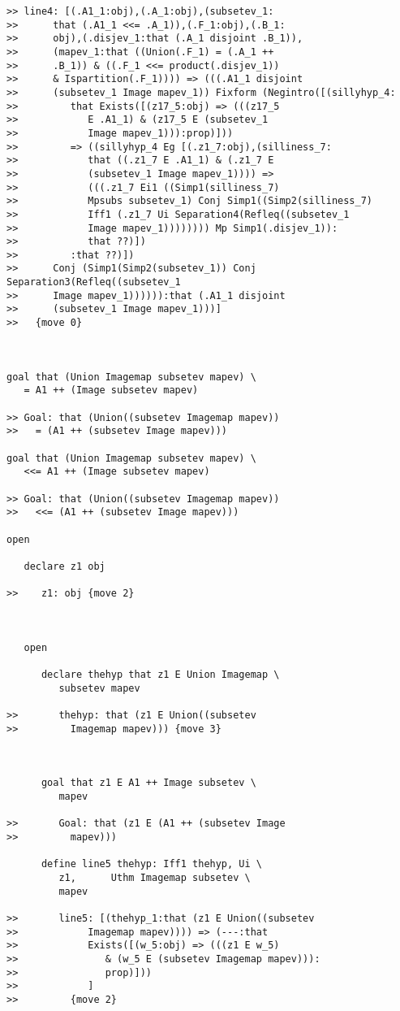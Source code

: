 \documentclass[12pt]{article}
\begin{document}
\begin{verbatim}
>> line4: [(.A1_1:obj),(.A_1:obj),(subsetev_1:
>>      that (.A1_1 <<= .A_1)),(.F_1:obj),(.B_1:
>>      obj),(.disjev_1:that (.A_1 disjoint .B_1)),
>>      (mapev_1:that ((Union(.F_1) = (.A_1 ++
>>      .B_1)) & ((.F_1 <<= product(.disjev_1))
>>      & Ispartition(.F_1)))) => (((.A1_1 disjoint
>>      (subsetev_1 Image mapev_1)) Fixform (Negintro([(sillyhyp_4:
>>         that Exists([(z17_5:obj) => (((z17_5
>>            E .A1_1) & (z17_5 E (subsetev_1
>>            Image mapev_1))):prop)]))
>>         => ((sillyhyp_4 Eg [(.z1_7:obj),(silliness_7:
>>            that ((.z1_7 E .A1_1) & (.z1_7 E
>>            (subsetev_1 Image mapev_1)))) =>
>>            (((.z1_7 Ei1 ((Simp1(silliness_7)
>>            Mpsubs subsetev_1) Conj Simp1((Simp2(silliness_7)
>>            Iff1 (.z1_7 Ui Separation4(Refleq((subsetev_1
>>            Image mapev_1)))))))) Mp Simp1(.disjev_1)):
>>            that ??)])
>>         :that ??)])
>>      Conj (Simp1(Simp2(subsetev_1)) Conj Separation3(Refleq((subsetev_1
>>      Image mapev_1)))))):that (.A1_1 disjoint
>>      (subsetev_1 Image mapev_1)))]
>>   {move 0}



goal that (Union Imagemap subsetev mapev) \
   = A1 ++ (Image subsetev mapev)

>> Goal: that (Union((subsetev Imagemap mapev))
>>   = (A1 ++ (subsetev Image mapev)))

goal that (Union Imagemap subsetev mapev) \
   <<= A1 ++ (Image subsetev mapev)

>> Goal: that (Union((subsetev Imagemap mapev))
>>   <<= (A1 ++ (subsetev Image mapev)))

open

   declare z1 obj

>>    z1: obj {move 2}



   open

      declare thehyp that z1 E Union Imagemap \
         subsetev mapev

>>       thehyp: that (z1 E Union((subsetev
>>         Imagemap mapev))) {move 3}



      goal that z1 E A1 ++ Image subsetev \
         mapev

>>       Goal: that (z1 E (A1 ++ (subsetev Image
>>         mapev)))

      define line5 thehyp: Iff1 thehyp, Ui \
         z1,      Uthm Imagemap subsetev \
         mapev

>>       line5: [(thehyp_1:that (z1 E Union((subsetev
>>            Imagemap mapev)))) => (---:that
>>            Exists([(w_5:obj) => (((z1 E w_5)
>>               & (w_5 E (subsetev Imagemap mapev))):
>>               prop)]))
>>            ]
>>         {move 2}




\end{verbatim}
\end{document}
